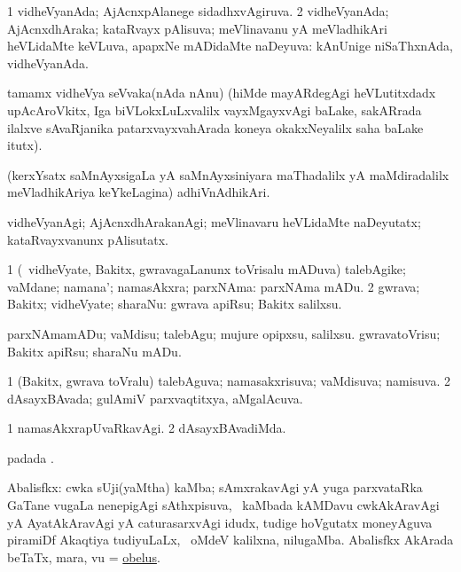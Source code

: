 \bentry
{}
\gl{\gu}
\bmng
\bnum
\num{1} vidheVyanAda; AjAcnxpAlanege sidadhxvAgiruva. 
\num{2} vidheVyanAda; AjAcnxdhAraka; kataRvayx pAlisuva; meVlinavanu yA meVladhikAri heVLidaMte keVLuva, apapxNe mADidaMte naDeyuva:  kAnUnige niSaThxnAda, vidheVyanAda. 
\enum
\emng

\noindent
\gl{\pagu}
\bmng
{} tamamx vidheVya seVvaka(nAda nAnu) (hiMde mayARdegAgi heVLutitxdadx upAcAroVkitx, Iga biVLokxLuLxvalilx vayxMgayxvAgi baLake, sakARrada ilalxve sAvaRjanika patarxvayxvahArada koneya okakxNeyalilx saha baLake itutx). 
\emng
\eentry

\bentry
{}
\gl{\nA}
\bmng
(kerxYsatx saMnAyxsigaLa yA saMnAyxsiniyara maThadalilx yA maMdiradalilx meVladhikAriya keYkeLagina) adhiVnAdhikAri. 
\emng
\eentry

\bentry
{}
\gl{\kirxvi}
\bmng
vidheVyanAgi; AjAcnxdhArakanAgi; meVlinavaru heVLidaMte naDeyutatx; kataRvayxvanunx pAlisutatx. 
\emng
\eentry

\bentry
{}
\gl{\nA}
\bmng
\bnum
\num{1} (\kanmu\ vidheVyate, Bakitx, gwravagaLanunx toVrisalu mADuva) talebAgike; vaMdane; namana'; namasAkxra; parxNAma:  parxNAma mADu. 
\num{2} gwrava; Bakitx; vidheVyate; sharaNu:  gwrava apiRsu; Bakitx salilxsu. 
\enum
\emng

\noindent
\gl{\pagu}
\bmng
{} 
\banum
{} parxNAmamADu; vaMdisu; talebAgu; mujure opipxsu, salilxsu. 
 gwravatoVrisu; Bakitx apiRsu; sharaNu mADu. 
\eanum
\emng
\eentry

\bentry
{}
\gl{\gu}
\bmng
\bnum
\num{1} (Bakitx, gwrava toVralu) talebAguva; namasakxrisuva; vaMdisuva; namisuva. 
\num{2} dAsayxBAvada; gulAmiV parxvaqtitxya, aMgalAcuva. 
\enum
\emng
\eentry

\bentry
{}
\gl{\kirxvi}
\bmng
\bnum
\num{1} namasAkxrapUvaRkavAgi. 
\num{2} dAsayxBAvadiMda. 
\enum
\emng
\eentry

\bentry
{}
\gl{\nA}
\bmng
{} padada \bava. 
\emng
\eentry

\bentry
{}
\gl{\nA}
\bmng
Abalisfkx: 
\banum
{} cwka sUji(yaMtha) kaMba; sAmxrakavAgi yA yuga parxvataRka GaTane \mo vugaLa nenepigAgi sAthxpisuva, \sA\ kaMbada kAMDavu cwkAkAravAgi yA AyatAkAravAgi yA caturasarxvAgi idudx, tudige hoVgutatx moneyAguva piramiDf Akaqtiya tudiyuLaLx, \sA\ oMdeV kalilxna, nilugaMba.  
 Abalisfkx AkArada beTaTx, mara, \mo vu 
 = \hyperlink{obelus}{obelus}. 
\eanum
\emng

